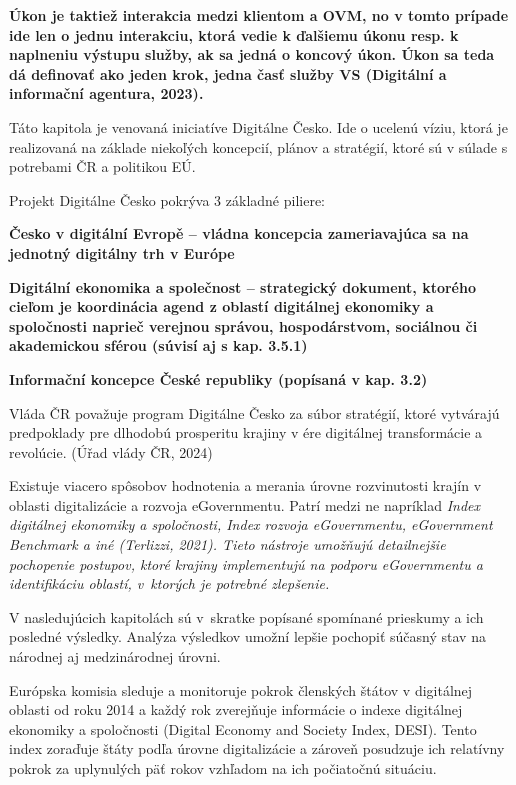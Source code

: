 \start \bf Úkon \stop je taktiež interakcia medzi klientom a OVM, no v tomto prípade ide len o jednu interakciu, ktorá vedie k ďalšiemu úkonu resp. k naplneniu výstupu služby, ak sa jedná o koncový úkon. Úkon sa teda dá definovať ako jeden krok, jedna časť služby VS \scr(Digitální a informační agentura, 2023).



Táto kapitola je venovaná iniciatíve Digitálne Česko. Ide o ucelenú víziu, ktorá je realizovaná na základe niekoľých koncepcií, plánov a stratégií, ktoré sú v súlade s potrebami ČR a politikou EÚ.

Projekt Digitálne Česko pokrýva 3 základné piliere:
\startitemize
\item{\start \bf Česko v digitální Evropě \stop -- vládna koncepcia zameriavajúca sa na jednotný digitálny trh v Európe} 
\item{\start \bf Digitální ekonomika a společnost \stop -- strategický dokument, ktorého cieľom je koordinácia agend z oblastí digitálnej ekonomiky a spoločnosti naprieč verejnou správou, hospodárstvom, sociálnou či akademickou sférou (súvisí aj s kap. 3.5.1)}
\item{\start \bf Informační koncepce České republiky \stop (popísaná v kap. 3.2)}
\stopitemize

Vláda ČR považuje program Digitálne Česko za súbor stratégií, ktoré vytvárajú predpoklady pre dlhodobú prosperitu krajiny v ére digitálnej transformácie a revolúcie. (Úřad vlády ČR, 2024)


Existuje viacero spôsobov hodnotenia a merania úrovne rozvinutosti krajín v oblasti digitalizácie a rozvoja eGovernmentu. Patrí medzi ne napríklad \start \it Index digitálnej ekonomiky a spoločnosti, Index rozvoja eGovernmentu, eGovernment Benchmark \stop a iné \scr(Terlizzi, 2021). Tieto nástroje umožňujú detailnejšie pochopenie postupov, ktoré krajiny implementujú na podporu eGovernmentu a identifikáciu oblastí, v~ktorých je potrebné zlepšenie.

V nasledujúcich kapitolách sú v~skratke popísané spomínané prieskumy a ich posledné výsledky. Analýza výsledkov umožní lepšie pochopiť súčasný stav na národnej aj medzinárodnej úrovni.

Európska komisia sleduje a monitoruje pokrok členských štátov v digitálnej oblasti od roku 2014 a každý rok zverejňuje informácie o indexe digitálnej ekonomiky a spoločnosti (Digital Economy and Society Index, DESI). Tento index zoraďuje štáty podľa úrovne digitalizácie a zároveň posudzuje ich relatívny pokrok za uplynulých päť rokov vzhľadom na ich počiatočnú situáciu.

